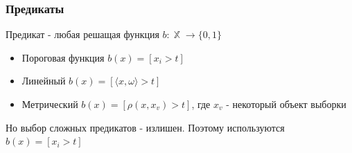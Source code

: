 \documentclass{beamer}
\DeclareMathOperator{\X}{\mathbb{X}}
\begin{document}
	\begin{frame}
		\frametitle{Предикаты}

		Предикат - любая решащая функция $b :\X \rightarrow \{0, 1\}$
		
		\vspace{15pt}

		\begin{itemize}
			\item Пороговая функция $b(x) = [x_i > t]$
			\item Линейный $b(x) = [\langle x, \omega \rangle > t]$
			\item Метрический $b(x) = [\rho(x, x_v) > t]$, где $x_v$ - некоторый объект выборки
		\end{itemize}

		\vspace{15pt}

		Но выбор сложных предикатов - излишен. Поэтому используются $b(x) = [x_i > t]$
	\end{frame}

	\begin{frame}
		\frametitle{}
		

	\end{frame}
\end{document}
